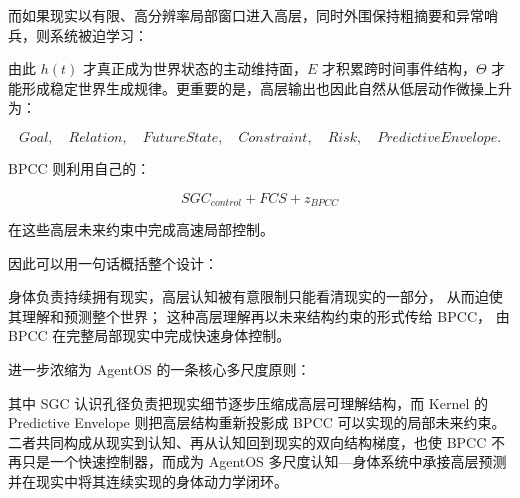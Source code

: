 而如果现实以有限、高分辨率局部窗口进入高层，同时外围保持粗摘要和异常哨兵，则系统被迫学习：

\begin{statementbox}
\centering
{}
\end{statementbox}

由此 $h(t)$ 才真正成为世界状态的主动维持面，$E$ 才积累跨时间事件结构，$\Theta$ 才能形成稳定世界生成规律。更重要的是，高层输出也因此自然从低层动作微操上升为：

\[
Goal,
\quad
Relation,
\quad
FutureState,
\quad
Constraint,
\quad
Risk,
\quad
PredictiveEnvelope.
\]

BPCC 则利用自己的：

\[
SGC_{control}
+
FCS
+
z_{BPCC}
\]

在这些高层未来约束中完成高速局部控制。

因此可以用一句话概括整个设计：

\begin{conclusion}
身体负责持续拥有现实，高层认知被有意限制只能看清现实的一部分，
从而迫使其理解和预测整个世界；
这种高层理解再以未来结构约束的形式传给 BPCC，
由 BPCC 在完整局部现实中完成快速身体控制。
\end{conclusion}

进一步浓缩为 AgentOS 的一条核心多尺度原则：

\begin{statementbox}
\centering
{}
\end{statementbox}

其中 SGC 认识孔径负责把现实细节逐步压缩成高层可理解结构，而 Kernel 的 Predictive Envelope 则把高层结构重新投影成 BPCC 可以实现的局部未来约束。二者共同构成从现实到认知、再从认知回到现实的双向结构梯度，也使 BPCC 不再只是一个快速控制器，而成为 AgentOS 多尺度认知—身体系统中承接高层预测并在现实中将其连续实现的身体动力学闭环。
